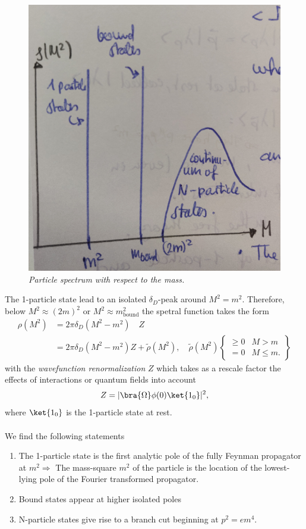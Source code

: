 \begin{figure}
	\centering
	\includegraphics[width=0.7\linewidth]{gfx/SpectrumInteractingTheoryMass}
	\caption{\itshape Particle spectrum with respect to the mass.}
	\label{fig:spectruminteractingtheorymass}
\end{figure}
The 1-particle state lead to an isolated $\delta_D$-peak around $M^2=m^2$. Therefore, below $M^2\approx(2m)^2$ or $M^2\approx m^2_{\mathrm{bound}}$ the spetral function takes the form
\begin{align}
	\rho(M^2) &= 2 \pi \delta_D(M^2-m^2) \quad Z \\
	&= 2 \pi \delta_D(M^2-m^2) Z+ \tilde{\rho}(M^2), \quad \tilde{\rho} (M^2) \left\{ \begin{array}{lr} \geq 0 & M>m \\
		=0 & M \leq m.
	\end{array}\right\}
\end{align}
with the \emph{wavefunction renormalization} $Z$ which takes as a rescale factor the effects of interactions or quantum fields into account
\begin{equation}
	Z=|\bra{\Omega}\phi(0)\ket{1_0}|^2,
\end{equation}
where $\ket{1_0}$ is the 1-particle state at rest.
\\
\\
We find the following statements 
\begin{enumerate}
	\item
	  The 1-particle state is the first analytic pole of the fully Feynman propagator at $m^2 \Rightarrow$ The mass-square $m^2$ of the particle is the location of the lowest-lying pole of the Fourier transformed propagator.
	\item Bound states appear at higher isolated poles
	\item N-particle states give rise to a branch cut beginning at $p^2=em^4$.
\end{enumerate}
